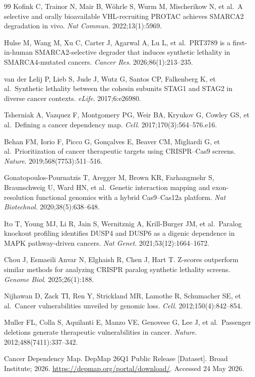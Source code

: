 \documentclass[11pt,a4paper]{article}
\begin{document}
\begin{thebibliography}{99}
 Kofink C, Trainor N, Mair B, W\"ohrle S, Wurm M, Mischerikow N, et al.\ A selective and orally bioavailable VHL-recruiting PROTAC achieves SMARCA2 degradation in vivo. \textit{Nat Commun}. 2022;13(1):5969.

 Hulse M, Wang M, Xu C, Carter J, Agarwal A, Lu L, et al.\ PRT3789 is a first-in-human SMARCA2-selective degrader that induces synthetic lethality in SMARCA4-mutated cancers. \textit{Cancer Res}. 2026;86(1):213--235.

 van der Lelij P, Lieb S, Jude J, Wutz G, Santos CP, Falkenberg K, et al.\ Synthetic lethality between the cohesin subunits STAG1 and STAG2 in diverse cancer contexts. \textit{eLife}. 2017;6:e26980.

 Tsherniak A, Vazquez F, Montgomery PG, Weir BA, Kryukov G, Cowley GS, et al.\ Defining a cancer dependency map. \textit{Cell}. 2017;170(3):564--576.e16.

 Behan FM, Iorio F, Picco G, Gon\c{c}alves E, Beaver CM, Migliardi G, et al.\ Prioritization of cancer therapeutic targets using CRISPR--Cas9 screens. \textit{Nature}. 2019;568(7753):511--516.

 Gonatopoulos-Pournatzis T, Aregger M, Brown KR, Farhangmehr S, Braunschweig U, Ward HN, et al.\ Genetic interaction mapping and exon-resolution functional genomics with a hybrid Cas9--Cas12a platform. \textit{Nat Biotechnol}. 2020;38(5):638--648.

 Ito T, Young MJ, Li R, Jain S, Wernitznig A, Krill-Burger JM, et al.\ Paralog knockout profiling identifies DUSP4 and DUSP6 as a digenic dependence in MAPK pathway-driven cancers. \textit{Nat Genet}. 2021;53(12):1664--1672.

 Chou J, Esmaeili Anvar N, Elghaish R, Chen J, Hart T. Z-scores outperform similar methods for analyzing CRISPR paralog synthetic lethality screens. \textit{Genome Biol}. 2025;26(1):188.

 Nijhawan D, Zack TI, Ren Y, Strickland MR, Lamothe R, Schumacher SE, et al.\ Cancer vulnerabilities unveiled by genomic loss. \textit{Cell}. 2012;150(4):842--854.

 Muller FL, Colla S, Aquilanti E, Manzo VE, Genovese G, Lee J, et al.\ Passenger deletions generate therapeutic vulnerabilities in cancer. \textit{Nature}. 2012;488(7411):337--342.

 Cancer Dependency Map. DepMap 26Q1 Public Release [Dataset]. Broad Institute; 2026. \url{https://depmap.org/portal/download/}. Accessed 24 May 2026.


\end{thebibliography}
\end{document}
